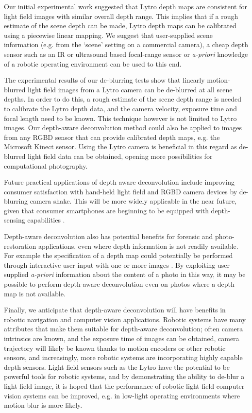 Our initial experimental work suggested that Lytro depth maps are consistent for light field images with similar overall depth range.
This implies that if a rough estimate of the scene depth can be made, Lytro depth maps can be calibrated using a piecewise linear mapping.
We suggest that user-supplied scene information (e.g. from the \enquote*{scene} setting on a commercial camera), a cheap depth sensor such as an IR or ultrasound based focal-range sensor or \emph{a-priori} knowledge of a robotic operating environment can be used to this end.

The experimental results of our de-blurring tests show that linearly motion-blurred light field images from a Lytro camera can be de-blurred at all scene depths.
In order to do this, a rough estimate of the scene depth range is needed to calibrate the Lytro depth data, and the camera velocity, exposure time and focal length need to be known.
This technique however is not limited to Lytro images.
Our depth-aware deconvolution method could also be applied to images from any RGBD sensor that can provide calibrated depth maps, e.g. the Microsoft Kinect sensor. 
Using the Lytro camera is beneficial in this regard as de-blurred light field data can be obtained, opening more possibilities for computational photography.

Future practical applications of depth aware deconvolution include improving consumer satisfaction with hand-held light field and RGBD camera devices by de-blurring camera shake.
This will be more widely applicable in the near future, given that consumer smartphones are beginning to be equipped with depth-sensing capabilities \cite{google2014lensblur, google2014tango}.

Depth-aware deconvolution also has potential benefits for forensic and photo-restoration applications, even where depth information is not readily available.
For example the specification of a depth map could potentially be performed through interactive user input with one or more images \cite{sinha2008interactive}.
By exploiting user supplied \emph{a-priori} information about the content of a photo in this way, it may be possible to perform depth-aware deconvolution even on photos where a depth map is not available. 

Finally, we anticipate that depth-aware deconvolution will have benefits in robotic navigation and computer vision applications.
Robotic systems have many attributes that make them suitable for depth-aware deconvolution; often camera intrinsics are known, and the exposure time of images can be obtained, camera trajectory will likely be known thanks to motion encoders or other robotic sensors, and increasingly, more robotic systems are incorporating highly capable depth sensors.
Light field sensors such as the Lytro have the potential to be powerful tools for robotic systems, and by demonstrating the ability to de-blur a light field image, it is hoped that the performance of robotic light field computer vision systems can be improved, e.g. in low-light operating environments where motion blur is more likely.


